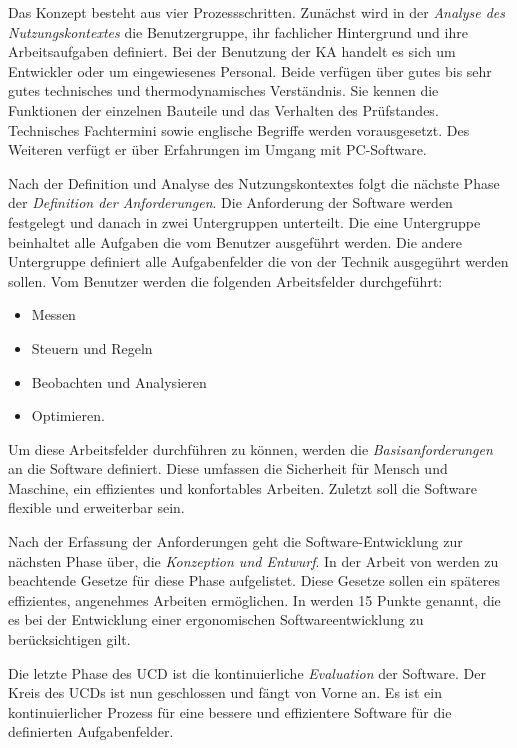Das Konzept besteht aus vier Prozessschritten. Zunächst wird in der \textit{Analyse des Nutzungskontextes} die Benutzergruppe, ihr fachlicher Hintergrund und ihre Arbeitsaufgaben definiert. Bei der Benutzung der KA handelt es sich um Entwickler oder um eingewiesenes Personal. Beide verfügen über gutes bis sehr gutes technisches und thermodynamisches Verständnis. Sie kennen die Funktionen der einzelnen Bauteile und das Verhalten des Prüfstandes. Technisches Fachtermini sowie englische Begriffe werden vorausgesetzt.  Des Weiteren verfügt er über Erfahrungen im Umgang mit PC-Software.

Nach der Definition und Analyse des Nutzungskontextes folgt die nächste Phase der \textit{Definition der Anforderungen}. Die Anforderung der Software werden festgelegt und danach in zwei Untergruppen unterteilt. Die eine Untergruppe beinhaltet alle Aufgaben die vom Benutzer ausgeführt werden. Die andere Untergruppe definiert alle Aufgabenfelder die von der Technik ausgegührt werden sollen. 
Vom Benutzer werden die folgenden Arbeitsfelder durchgeführt:
\begin{itemize}
\item	Messen
\item	Steuern und Regeln
\item	Beobachten und Analysieren
\item	Optimieren.
\end{itemize}

Um diese Arbeitsfelder durchführen zu können, werden die \textit{Basisanforderungen} an die Software definiert. Diese umfassen die Sicherheit für Mensch und Maschine, ein effizientes und konfortables Arbeiten. Zuletzt soll die Software flexible und erweiterbar sein. 

Nach der Erfassung der Anforderungen geht die Software-Entwicklung zur nächsten Phase über, die \textit{Konzeption und Entwurf}. In der Arbeit von \textsc{\citeauthor{Neumann2007}} \citep{Neumann2007} werden zu beachtende Gesetze für diese Phase aufgelistet. Diese Gesetze sollen ein späteres effizientes, angenehmes Arbeiten ermöglichen. In \citep{Preim2013} werden 15 Punkte genannt, die es bei der Entwicklung einer ergonomischen Softwareentwicklung zu berücksichtigen gilt.

Die letzte Phase des UCD ist die kontinuierliche \textit{Evaluation} der Software. Der Kreis des UCDs ist nun geschlossen und fängt von Vorne an. Es ist ein kontinuierlicher Prozess für eine bessere und effizientere Software für die definierten Aufgabenfelder. 

